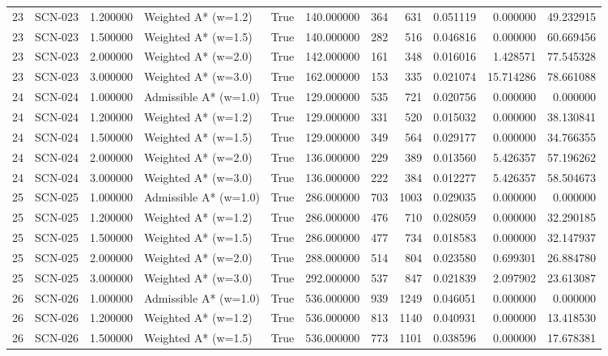 \begin{table}[htbp]
\begin{tabular}{rlrlrrrrrrr}
23 & SCN-023 & 1.200000 & Weighted A* (w=1.2) & True & 140.000000 & 364 & 631 & 0.051119 & 0.000000 & 49.232915 \\
23 & SCN-023 & 1.500000 & Weighted A* (w=1.5) & True & 140.000000 & 282 & 516 & 0.046816 & 0.000000 & 60.669456 \\
23 & SCN-023 & 2.000000 & Weighted A* (w=2.0) & True & 142.000000 & 161 & 348 & 0.016016 & 1.428571 & 77.545328 \\
23 & SCN-023 & 3.000000 & Weighted A* (w=3.0) & True & 162.000000 & 153 & 335 & 0.021074 & 15.714286 & 78.661088 \\
24 & SCN-024 & 1.000000 & Admissible A* (w=1.0) & True & 129.000000 & 535 & 721 & 0.020756 & 0.000000 & 0.000000 \\
24 & SCN-024 & 1.200000 & Weighted A* (w=1.2) & True & 129.000000 & 331 & 520 & 0.015032 & 0.000000 & 38.130841 \\
24 & SCN-024 & 1.500000 & Weighted A* (w=1.5) & True & 129.000000 & 349 & 564 & 0.029177 & 0.000000 & 34.766355 \\
24 & SCN-024 & 2.000000 & Weighted A* (w=2.0) & True & 136.000000 & 229 & 389 & 0.013560 & 5.426357 & 57.196262 \\
24 & SCN-024 & 3.000000 & Weighted A* (w=3.0) & True & 136.000000 & 222 & 384 & 0.012277 & 5.426357 & 58.504673 \\
25 & SCN-025 & 1.000000 & Admissible A* (w=1.0) & True & 286.000000 & 703 & 1003 & 0.029035 & 0.000000 & 0.000000 \\
25 & SCN-025 & 1.200000 & Weighted A* (w=1.2) & True & 286.000000 & 476 & 710 & 0.028059 & 0.000000 & 32.290185 \\
25 & SCN-025 & 1.500000 & Weighted A* (w=1.5) & True & 286.000000 & 477 & 734 & 0.018583 & 0.000000 & 32.147937 \\
25 & SCN-025 & 2.000000 & Weighted A* (w=2.0) & True & 288.000000 & 514 & 804 & 0.023580 & 0.699301 & 26.884780 \\
25 & SCN-025 & 3.000000 & Weighted A* (w=3.0) & True & 292.000000 & 537 & 847 & 0.021839 & 2.097902 & 23.613087 \\
26 & SCN-026 & 1.000000 & Admissible A* (w=1.0) & True & 536.000000 & 939 & 1249 & 0.046051 & 0.000000 & 0.000000 \\
26 & SCN-026 & 1.200000 & Weighted A* (w=1.2) & True & 536.000000 & 813 & 1140 & 0.040931 & 0.000000 & 13.418530 \\
26 & SCN-026 & 1.500000 & Weighted A* (w=1.5) & True & 536.000000 & 773 & 1101 & 0.038596 & 0.000000 & 17.678381 \\

\end{tabular}
\end{table}
